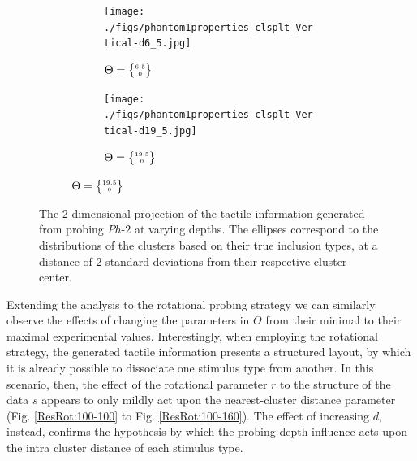 \documentclass[]{interact}
\theoremstyle{plain}%
\theoremstyle{definition}
\theoremstyle{remark}
\begin{document}
\begin{figure}[]
	\begin{subfigure}[b]{\textwidth}
		\begin{subfigure}[b]{.48\textwidth}
			\texttt{[image: ./figs/phantom1properties\_clsplt\_Vertical-d6\_5.jpg]}
			\caption{$\Theta = \tiny{\begin{Bmatrix}6.5\\ 0\end{Bmatrix}}$}
			\label{ResVert:dn0}
		\end{subfigure} 
		\hspace{0.01\textwidth}
		\begin{subfigure}[b]{0.48\textwidth}
			\texttt{[image: ./figs/phantom1properties\_clsplt\_Vertical-d19\_5.jpg]}
			\caption{$\Theta = \tiny{\begin{Bmatrix}19.5\\ 0\end{Bmatrix}}$}
			\label{ResVert:dn9}
		\end{subfigure}
	\end{subfigure}
	\caption{The 2-dimensional projection of the tactile information generated from probing $Ph\text{-}2$ 
		at varying depths. The ellipses correspond to the distributions of the clusters based on their true 
		inclusion types, at a distance of 2 standard deviations from their respective cluster center.}
	\label{ResVert}
\end{figure}

Extending the analysis to the rotational probing strategy we can similarly observe the effects of 
changing the parameters in $\Theta$ from their minimal to their maximal experimental values. 
Interestingly, when employing the rotational strategy, the generated tactile information presents a 
structured layout, by which it is already possible to dissociate one stimulus type from another. In this 
scenario, then, the effect of the rotational parameter $r$ to the structure of the data $s$ appears to 
only mildly act upon the nearest-cluster distance parameter (Fig. \ref{ResRot:100-100} to 
Fig. \ref{ResRot:100-160}). The effect of increasing $d$, instead, confirms the hypothesis 
by which the probing depth influence acts upon the intra cluster distance of each stimulus type.  
\end{document}

